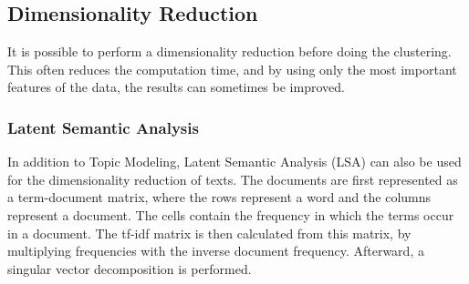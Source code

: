 \subsection{Dimensionality Reduction}
It is possible to perform a dimensionality reduction before doing the clustering.
This often reduces the computation time, and by using only the most important features of the data, the results can sometimes be improved.  

\subsubsection{Latent Semantic Analysis }
In addition to Topic Modeling, Latent Semantic Analysis (LSA) can also be used for the dimensionality reduction of texts.
The documents are first represented as a term-document matrix, where the rows represent a word and the columns represent a document.
The cells contain the frequency in which the terms occur in a document.
The tf-idf matrix is then calculated from this matrix, by multiplying frequencies with the inverse document frequency.
Afterward, a singular vector decomposition is performed.\cite{lsa}
